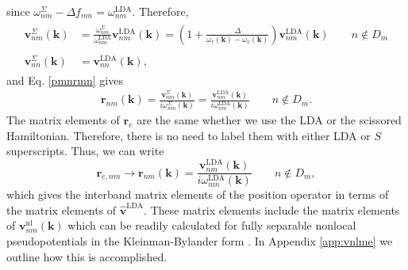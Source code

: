 since $\omega^\Sigma_{nm}-\Delta f_{mn}=\omega^{\mathrm{LDA}}_{nm}$. Therefore,
\begin{align}\label{chon.9}
\begin{split}
\mathbf{v}^\Sigma_{nm}(\mathbf{k}) &=
\frac{\omega^\Sigma_{nm}}{\omega^{\mathrm{LDA}}_{nm}}
\mathbf{v}^\mathrm{LDA}_{nm}(\mathbf{k})
= \left(
1 + \frac{\Delta}{\omega_c(\mathbf{k})-\omega_v(\mathbf{k})}
\right)
\mathbf{v}^\mathrm{LDA}_{nm}(\mathbf{k})\qquad n\notin D_{m}\\\\
\mathbf{v}^\Sigma_{nn}(\mathbf{k}) &= \mathbf{v}^\mathrm{LDA}_{nn}(\mathbf{k}),
\end{split}
\end{align} 
and Eq. \eqref{pmnrmn} gives
\begin{align}\label{chon.10}
\mathbf{r}_{nm}(\mathbf{k})
= \frac{\mathbf{v}^\Sigma_{nm}(\mathbf{k})}{i\omega^\Sigma_{nm}(\mathbf{k})}
= \frac{\mathbf{v}^\mathrm{LDA}_{nm}(\mathbf{k})}
{i\omega^{\mathrm{LDA}}_{nm}(\mathbf{k})} \qquad n\notin D_{m}.
\end{align}
The matrix elements of $\mathbf{r}_{e}$ are the same whether we use the LDA or
the scissored Hamiltonian. Therefore, there is no need to label them with either
LDA or $S$ superscripts. Thus, we can write
\begin{equation}\label{chon.98}
\mathbf{r}_{e,nm}\to\mathbf{r}_{nm}(\mathbf{k}) =
\frac{\mathbf{v}^\mathrm{LDA}_{nm}(\mathbf{k})}
     {i\omega^{\mathrm{LDA}}_{nm}(\mathbf{k})}
\qquad n\notin D_{m},
\end{equation}   
which gives the interband matrix elements of the position operator in terms of
the matrix elements of $\hat{\mathbf{v}}^\mathrm{LDA}$. These matrix elements
include the matrix elements of $\mathbf{v}^{\mathrm{nl}}_{nm}(\mathbf{k})$ which
can be readily calculated for fully separable nonlocal pseudopotentials in the
Kleinman-Bylander form \cite{mottaCMS10, kleinmanPRL82, adolphPRB96}. In
Appendix \ref{app:vnlme} we outline how this is accomplished.




